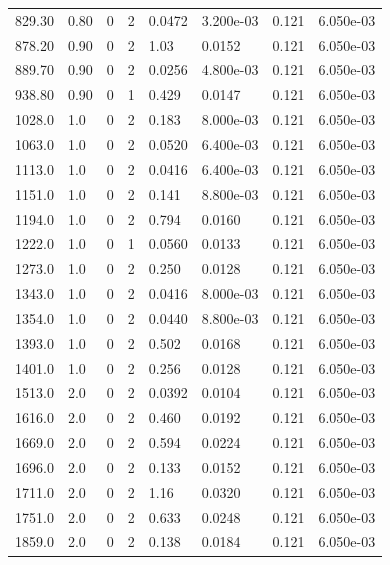 \documentclass[preview]{standalone}
\begin{document}
{{\begin{tabular}{L{1.2cm}C{1.2cm} C{0.3cm}C{0.5cm} C{1.4cm}C{1.4cm} C{1.4cm}C{1.4cm}}
  829.30  &  0.80  & 0     &  2 &  0.0472  & 3.200e-03  & 0.121 &  6.050e-03   \\ 
  878.20  &  0.90  & 0     &  2 &  1.03  & 0.0152  & 0.121 &  6.050e-03   \\ 
  889.70  &  0.90  & 0     &  2 &  0.0256  & 4.800e-03  & 0.121 &  6.050e-03   \\ 
  938.80  &  0.90  & 0     &  1 &  0.429  & 0.0147  & 0.121 &  6.050e-03   \\ 
  1028.0  &   1.0  & 0     &  2 &  0.183  & 8.000e-03  & 0.121 &  6.050e-03   \\ 
  1063.0  &   1.0  & 0     &  2 &  0.0520  & 6.400e-03  & 0.121 &  6.050e-03   \\ 
  1113.0  &   1.0  & 0     &  2 &  0.0416  & 6.400e-03  & 0.121 &  6.050e-03   \\ 
  1151.0  &   1.0  & 0     &  2 &  0.141  & 8.800e-03  & 0.121 &  6.050e-03   \\ 
  1194.0  &   1.0  & 0     &  2 &  0.794  & 0.0160  & 0.121 &  6.050e-03   \\ 
  1222.0  &   1.0  & 0     &  1 &  0.0560  & 0.0133  & 0.121 &  6.050e-03   \\ 
  1273.0  &   1.0  & 0     &  2 &  0.250  & 0.0128  & 0.121 &  6.050e-03   \\ 
  1343.0  &   1.0  & 0     &  2 &  0.0416  & 8.000e-03  & 0.121 &  6.050e-03   \\ 
  1354.0  &   1.0  & 0     &  2 &  0.0440  & 8.800e-03  & 0.121 &  6.050e-03   \\ 
  1393.0  &   1.0  & 0     &  2 &  0.502  & 0.0168  & 0.121 &  6.050e-03   \\ 
  1401.0  &   1.0  & 0     &  2 &  0.256  & 0.0128  & 0.121 &  6.050e-03   \\ 
  1513.0  &   2.0  & 0     &  2 &  0.0392  & 0.0104  & 0.121 &  6.050e-03   \\ 
  1616.0  &   2.0  & 0     &  2 &  0.460  & 0.0192  & 0.121 &  6.050e-03   \\ 
  1669.0  &   2.0  & 0     &  2 &  0.594  & 0.0224  & 0.121 &  6.050e-03   \\ 
  1696.0  &   2.0  & 0     &  2 &  0.133  & 0.0152  & 0.121 &  6.050e-03   \\ 
  1711.0  &   2.0  & 0     &  2 &  1.16  & 0.0320  & 0.121 &  6.050e-03   \\ 
  1751.0  &   2.0  & 0     &  2 &  0.633  & 0.0248  & 0.121 &  6.050e-03   \\ 
  1859.0  &   2.0  & 0     &  2 &  0.138  & 0.0184  & 0.121 &  6.050e-03   \\ 

\end{tabular}}}
\end{document}
